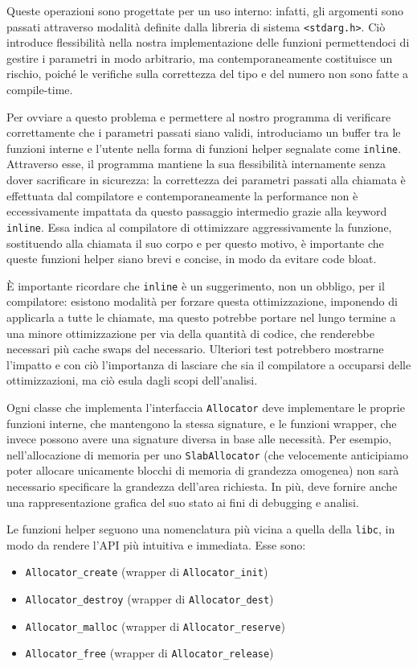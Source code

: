 Queste operazioni sono progettate per un uso interno: infatti, gli argomenti sono passati attraverso modalità definite dalla libreria di sistema \texttt{<stdarg.h>}. Ciò introduce flessibilità nella nostra implementazione delle funzioni permettendoci di gestire i parametri in modo arbitrario, ma contemporaneamente costituisce un rischio, poiché le verifiche sulla correttezza del tipo e del numero non sono fatte a compile-time.

Per ovviare a questo problema e permettere al nostro programma di verificare correttamente che i parametri passati siano validi, introduciamo un buffer tra le funzioni interne e l’utente nella forma di funzioni helper segnalate come \texttt{inline}. Attraverso esse, il programma mantiene la sua flessibilità internamente senza dover sacrificare in sicurezza: la correttezza dei parametri passati alla chiamata è effettuata dal compilatore e contemporaneamente la performance non è eccessivamente impattata da questo passaggio intermedio grazie alla keyword \texttt{inline}. Essa indica al compilatore di ottimizzare aggressivamente la funzione, sostituendo alla chiamata il suo corpo e per questo motivo, è importante che queste funzioni helper siano brevi e concise, in modo da evitare code bloat.

È importante ricordare che \texttt{inline} è un suggerimento, non un obbligo, per il compilatore: esistono modalità per forzare questa ottimizzazione, imponendo di applicarla a tutte le chiamate, ma questo potrebbe portare nel lungo termine a una minore ottimizzazione per via della quantità di codice, che renderebbe necessari più cache swaps del necessario. Ulteriori test potrebbero mostrarne l’impatto e con ciò l’importanza di lasciare che sia il compilatore a occuparsi delle ottimizzazioni, ma ciò esula dagli scopi dell’analisi.

Ogni classe che implementa l’interfaccia \texttt{Allocator} deve implementare le proprie funzioni interne, che mantengono la stessa signature, e le funzioni wrapper, che invece possono avere una signature diversa in base alle necessità. Per esempio, nell’allocazione di memoria per uno \texttt{SlabAllocator} (che velocemente anticipiamo poter allocare unicamente blocchi di memoria di grandezza omogenea) non sarà necessario specificare la grandezza dell’area richiesta. In più, deve fornire anche una rappresentazione grafica del suo stato ai fini di debugging e analisi.

Le funzioni helper seguono una nomenclatura più vicina a quella della \texttt{libc}, in modo da rendere l’API più intuitiva e immediata. Esse sono:
\begin{itemize}
  \item \texttt{Allocator\_create} (wrapper di \texttt{Allocator\_init})
  \item \texttt{Allocator\_destroy} (wrapper di \texttt{Allocator\_dest})
  \item \texttt{Allocator\_malloc} (wrapper di \texttt{Allocator\_reserve})
  \item \texttt{Allocator\_free} (wrapper di \texttt{Allocator\_release})
\end{itemize}

